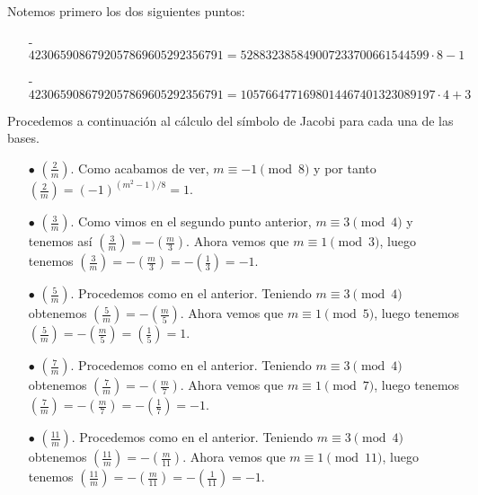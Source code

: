 \documentclass[fleqn]{article}
\begin{document}
    Notemos primero los dos siguientes puntos:
    \begin{enumerate}
        \item[-] $ 4230659086792057869605292356791 = 528832385849007233700661544599\cdot 8 - 1 $
        \item[-] $ 4230659086792057869605292356791 = 1057664771698014467401323089197\cdot 4 + 3$
    \end{enumerate}
    Procedemos a continuación al cálculo del símbolo de Jacobi para cada una de las bases.\\ 
    \begin{enumerate}
        \item[$\bullet$] $\left(\frac{2}{m}\right)$. Como acabamos de ver, $m \equiv -1 \pmod{8}$ y por tanto 
                        $\left(\frac{2}{m}\right) = (-1)^{(m^2 - 1)/8} = 1$.
        \item[$\bullet$] $\left(\frac{3}{m}\right)$. Como vimos en el segundo punto anterior, $m \equiv 3 \pmod{4}$ y tenemos así
                        $\left(\frac{3}{m}\right) = -\left(\frac{m}{3}\right)$. Ahora vemos que $m \equiv 1 \pmod{3}$, luego tenemos 
                        $\left(\frac{3}{m}\right) = -\left(\frac{m}{3}\right) = -\left(\frac{1}{3}\right) = -1$.
        \item[$\bullet$] $\left(\frac{5}{m}\right)$. Procedemos como en el anterior. Teniendo $m \equiv 3 \pmod{4}$ obtenemos
                        $\left(\frac{5}{m}\right) = -\left(\frac{m}{5}\right)$. Ahora vemos que $m \equiv 1 \pmod{5}$, luego tenemos 
                        $\left(\frac{5}{m}\right) = -\left(\frac{m}{5}\right) = \left(\frac{1}{5}\right) = 1$.
        \item[$\bullet$] $\left(\frac{7}{m}\right)$. Procedemos como en el anterior. Teniendo $m \equiv 3 \pmod{4}$ obtenemos
                        $\left(\frac{7}{m}\right) = -\left(\frac{m}{7}\right)$. Ahora vemos que $m \equiv 1 \pmod{7}$, luego tenemos 
                        $\left(\frac{7}{m}\right) = -\left(\frac{m}{7}\right) = -\left(\frac{1}{7}\right) = -1$.
        \item[$\bullet$] $\left(\frac{11}{m}\right)$. Procedemos como en el anterior. Teniendo $m \equiv 3 \pmod{4}$ obtenemos
                        $\left(\frac{11}{m}\right) = -\left(\frac{m}{11}\right)$. Ahora vemos que $m \equiv 1 \pmod{11}$, luego tenemos 
                        $\left(\frac{11}{m}\right) = -\left(\frac{m}{11}\right) = -\left(\frac{1}{11}\right) = -1$.
    \end{enumerate}
\end{document}

